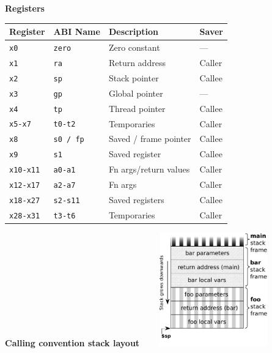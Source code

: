 \begin{multicols}{2}
        
\columnbreak

\textbf{Registers}\\
\begin{tabular} {|l | l | l | l|} \hline
Register     & ABI Name     & Description           & Saver  \\ \hline
\tt{x0}      & \tt{zero}    & Zero constant         & ---    \\
\tt{x1}      & \tt{ra}      & Return address        & Caller \\
\tt{x2}      & \tt{sp}      & Stack pointer         & Callee \\
\tt{x3}      & \tt{gp}      & Global pointer        & ---    \\
\tt{x4}      & \tt{tp}      & Thread pointer        & Callee \\
\tt{x5-x7}   & \tt{t0-t2}   & Temporaries           & Caller \\
\tt{x8}      & \tt{s0 / fp} & Saved / frame pointer & Callee \\
\tt{x9}      & \tt{s1}      & Saved register        & Callee \\
\tt{x10-x11} & \tt{a0-a1}   & Fn args/return values & Caller \\
\tt{x12-x17} & \tt{a2-a7}   & Fn args               & Caller \\
\tt{x18-x27} & \tt{s2-s11}  & Saved registers       & Callee \\
\tt{x28-x31} & \tt{t3-t6}   & Temporaries           & Caller \\ \hline
\end{tabular} 

\vspace{10ex}
\begin{flushright}
    \textbf{Calling convention stack layout$\qquad$}
    \includegraphics[width=0.35\textwidth]{img/call_stack_diagram.pdf}
\end{flushright}
    
\end{multicols}


